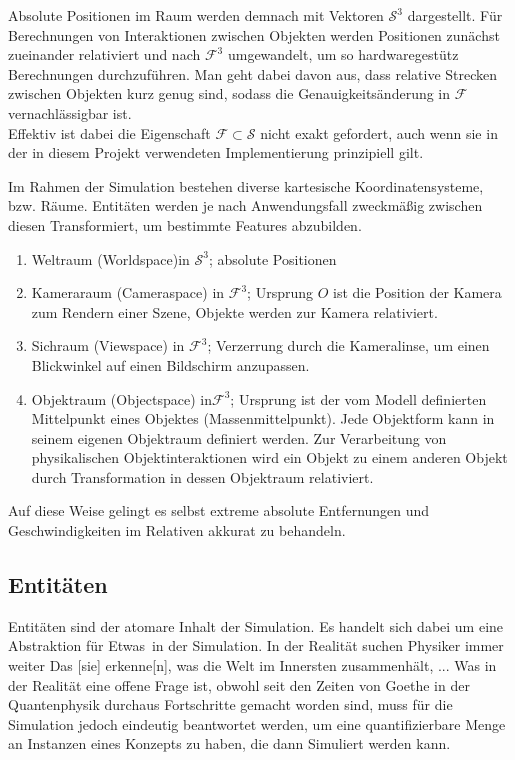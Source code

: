 Absolute Positionen im Raum werden demnach mit Vektoren $\mathcal{S}^3$ dargestellt. Für Berechnungen von Interaktionen zwischen Objekten werden Positionen zunächst zueinander relativiert und nach $\mathcal{F}^3$ umgewandelt, um so hardwaregestütz Berechnungen durchzuführen. 
Man geht dabei davon aus, dass relative Strecken zwischen Objekten kurz genug sind, sodass die Genauigkeitsänderung in $\mathcal{F}$ vernachlässigbar ist.\\
Effektiv ist dabei die Eigenschaft $\mathcal{F}\subset\mathcal{S}$ nicht exakt gefordert, auch wenn sie in der in diesem Projekt verwendeten Implementierung prinzipiell gilt.

Im Rahmen der Simulation bestehen diverse kartesische Koordinatensysteme, bzw. Räume. Entitäten werden je nach Anwendungsfall zweckmäßig zwischen diesen Transformiert, um bestimmte Features abzubilden.

\begin{enumerate}
\item Weltraum (Worldspace)in $\mathcal{S}^3$; absolute Positionen
\item Kameraraum (Cameraspace) in $\mathcal{F}^3$; Ursprung $O$ ist die Position der Kamera zum Rendern einer Szene, Objekte werden zur Kamera relativiert.
\item Sichraum (Viewspace) in $\mathcal{F}^3$; Verzerrung durch die Kameralinse, um einen Blickwinkel auf einen Bildschirm anzupassen.
\item Objektraum (Objectspace) in$\mathcal{F}^3$; Ursprung ist der vom Modell definierten Mittelpunkt eines Objektes (Massenmittelpunkt). Jede Objektform kann in seinem eigenen Objektraum definiert werden. Zur Verarbeitung von physikalischen Objektinteraktionen wird ein Objekt zu einem anderen Objekt durch Transformation in dessen Objektraum relativiert.
\end{enumerate}

Auf diese Weise gelingt es selbst extreme absolute Entfernungen und Geschwindigkeiten im Relativen akkurat zu behandeln.

\subsection{Entitäten}
\label{sec:entity}

Entitäten sind der atomare Inhalt der Simulation. Es handelt sich dabei um eine Abstraktion für \glqq Etwas\grqq ~in der Simulation. In der Realität suchen Physiker immer weiter \glqq Das [sie] erkenne[n], was die Welt im Innersten zusammenhält, ... Was in der Realität eine offene Frage ist, obwohl seit den Zeiten von Goethe in der Quantenphysik durchaus Fortschritte gemacht worden sind, muss für die Simulation jedoch eindeutig beantwortet werden, um eine quantifizierbare Menge an Instanzen eines Konzepts zu haben, die dann Simuliert werden kann.\\

